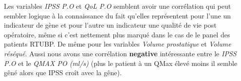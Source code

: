 Les variables  \emph{IPSS P.O} et   \emph{QoL P.O}  semblent avoir une corrélation qui peut sembler logique à la connaissance du fait qu’elles représentent pour l’une un indicateur de gène et pour l’autre un indicateur une qualité de vie post opératoire, même si c’est nettement plus marqué dans le cas de le panel des patients RTUBP. De même  pour les variables \emph{Volume prostatique} et \emph{Volume réséqué}. Aussi nous avons une corrélation \textbf{negative} intéressante entre le \emph{IPSS P.O} et le \emph{QMAX PO (ml/s)} (plus le patient à un QMax élevé moins il semble gêné alors que IPSS croît avec la gêne). 









%
